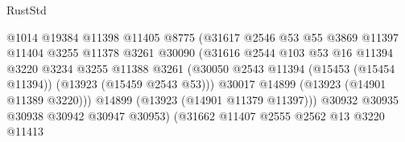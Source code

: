 \begin{lexlean}{RustStd}
\begin{coremodule}
                                          @1014
                                          @19384
                                          @11398
                                          @11405
                                          @8775
                                          (@31617
                                            @2546
                                            @53
                                            @55
                                            @3869
                                            @11397
                                            @11404
                                            @3255
                                            @11378
                                            @3261
                                            @30090
                                            (@31616
                                              @2544
                                              @103
                                              @53
                                              @16
                                              @11394
                                              @3220
                                              @3234
                                              @3255
                                              @11388
                                              @3261
                                              (@30050
                                                @2543
                                                @11394
                                                (@15453 (@15454 @11394))
                                                (@13923 (@15459 @2543 @53)))
                                              @30017
                                              @14899
                                              (@13923 (@14901 @11389 @3220)))
                                            @14899
                                            (@13923 (@14901 @11379 @11397)))
                                          @30932
                                          @30935
                                          @30938
                                          @30942
                                          @30947
                                          @30953)
                                        (@31662
                                          @11407
                                          @2555
                                          @2562
                                          @13
                                          @3220
                                          @11413

\end{coremodule}
\end{lexlean}
